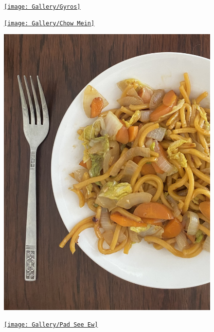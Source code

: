 \documentclass[]{article}
\begin{document}
\newpage\begin{figure}[H]
\begin{center}\hyperref[rec:Gyros]{\texttt{[image: Gallery/Gyros]}}\caption*{}\label{fig:Gyros}\end{center}
\end{figure}
\newpage\begin{figure}[H]
\begin{center}\hyperref[rec:Chow Mein]{\texttt{[image: Gallery/Chow Mein]}}\caption*{}\label{fig:Chow Mein}\end{center}
\end{figure}
\newpage\begin{figure}[H]
\begin{center}\hyperref[rec:Hokkien Mee]{\includegraphics[keepaspectratio,width=\textwidth,height=\textheight]{Gallery/Hokkien Mee}}\caption*{}\label{fig:Hokkien Mee}\end{center}
\end{figure}
\newpage\begin{figure}[H]
\begin{center}\hyperref[rec:Pad See Ew]{\texttt{[image: Gallery/Pad See Ew]}}\caption*{}\label{fig:Pad See Ew}\end{center}
\end{figure}
\end{document}
